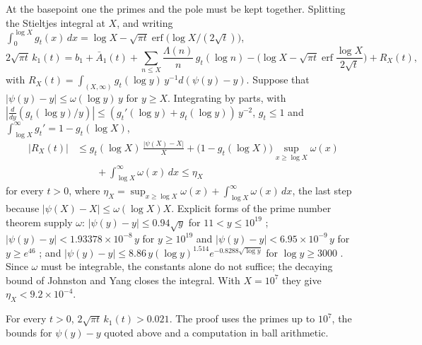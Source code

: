 At the basepoint one the primes and the pole must be kept together. Splitting the Stieltjes integral at $X$, and writing $\int_0^{\log X}g_t(x)\,dx=\log X-\sqrt{\pi t}\operatorname{erf}\big(\log X/(2\sqrt t)\big)$,
\begin{equation}\label{bp:eq:heatone}
2\sqrt{\pi t}\,k_1(t)=b_1+\bar A_1(t)+\sum_{n\le X}\frac{\Lambda(n)}n\,g_t(\log n)-\Big(\log X-\sqrt{\pi t}\operatorname{erf}\frac{\log X}{2\sqrt t}\Big)+R_X(t),
\end{equation}
with $R_X(t)=\int_{(X,\infty)}g_t(\log y)\,y^{-1}d(\psi(y)-y)$. Suppose that $|\psi(y)-y|\le\omega(\log y)\,y$ for $y\ge X$. Integrating by parts, with $|\frac d{dy}(g_t(\log y)/y)|\le(g_t'(\log y)+g_t(\log y))\,y^{-2}$, $g_t\le1$ and $\int_{\log X}^\infty g_t'=1-g_t(\log X)$,
\begin{equation}\label{bp:eq:eta}
\begin{split}
|R_X(t)|&\le g_t(\log X)\,\frac{|\psi(X)-X|}X+\big(1-g_t(\log X)\big)\sup_{x\ge\log X}\omega(x)\\
&\qquad+\int_{\log X}^\infty\omega(x)\,dx\le\eta_X
\end{split}
\end{equation}
for every $t>0$, where $\eta_X=\sup_{x\ge\log X}\omega(x)+\int_{\log X}^\infty\omega(x)\,dx$, the last step because $|\psi(X)-X|\le\omega(\log X)X$. Explicit forms of the prime number theorem supply $\omega$: $|\psi(y)-y|\le0.94\sqrt y$ for $11<y\le10^{19}$ \cite{Buthe18}; $|\psi(y)-y|<1.93378\times10^{-8}\,y$ for $y\ge10^{19}$ and $|\psi(y)-y|<6.95\times10^{-9}\,y$ for $y\ge e^{46}$ \cite{BKLNW21}; and $|\psi(y)-y|\le8.86\,y(\log y)^{1.514}e^{-0.8288\sqrt{\log y}}$ for $\log y\ge3000$ \cite{JY23}. Since $\omega$ must be integrable, the constants alone do not suffice; the decaying bound of Johnston and Yang closes the integral. With $X=10^7$ they give $\eta_X<9.2\times10^{-4}$.

\begin{proposition}\label{bp:prop:heatcert}
For every $t>0$, $2\sqrt{\pi t}\,k_1(t)>0.021$. The proof uses the primes up to $10^7$, the bounds for $\psi(y)-y$ quoted above and a computation in ball arithmetic.
\end{proposition}

